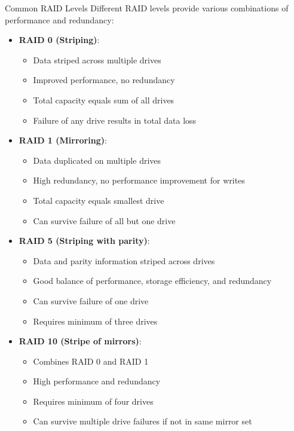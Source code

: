 \begin{theorem}{Common RAID Levels}
    Different RAID levels provide various combinations of performance and redundancy:
    \begin{itemize}
        \item \textbf{RAID 0 (Striping)}:
            \begin{itemize}
                \item Data striped across multiple drives
                \item Improved performance, no redundancy
                \item Total capacity equals sum of all drives
                \item Failure of any drive results in total data loss
            \end{itemize}
        \item \textbf{RAID 1 (Mirroring)}:
            \begin{itemize}
                \item Data duplicated on multiple drives
                \item High redundancy, no performance improvement for writes
                \item Total capacity equals smallest drive
                \item Can survive failure of all but one drive
            \end{itemize}
        \item \textbf{RAID 5 (Striping with parity)}:
            \begin{itemize}
                \item Data and parity information striped across drives
                \item Good balance of performance, storage efficiency, and redundancy
                \item Can survive failure of one drive
                \item Requires minimum of three drives
            \end{itemize}
        \item \textbf{RAID 10 (Stripe of mirrors)}:
            \begin{itemize}
                \item Combines RAID 0 and RAID 1
                \item High performance and redundancy
                \item Requires minimum of four drives
                \item Can survive multiple drive failures if not in same mirror set
            \end{itemize}
    \end{itemize}
\end{theorem}

